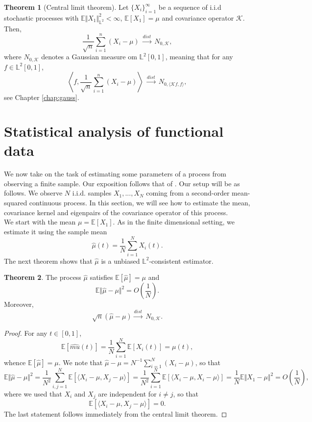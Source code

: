 \documentclass[10pt, a4paper]{report}
\newcommand{\E}[0]{\mathbb{E}}
\newcommand{\Ll}[0]{\mathbb{L}}
\newcommand{\K}[0]{\mathcal{K}}
\theoremstyle{definition}
\newtheorem{theorem}{Theorem}
\theoremstyle{remark}
\begin{document}
\begin{theorem}[Central limit theorem]
	Let $\{X_i\}_{i=1}^\infty$ be a sequence of i.i.d stochastic processes with $\E\Vert X_1 \Vert^2_{\Ll^2}<\infty$, $\E[X_1]=\mu$ and covariance operator $\K$. Then,
	$$\frac{1}{\sqrt{n}}\sum_{i=1}^{n}(X_i-\mu) \ \stackrel{dist}{\longrightarrow} \ N_{0,\K},$$
	where $N_{0,\K}$ denotes a Gaussian measure om $\Ll^2[0,1]$, meaning that for any $f\in \Ll^2[0,1]$,
	$$\left\langle f, \frac{1}{\sqrt{n}}\sum_{i=1}^{n}(X_i-\mu)\right\rangle \ \stackrel{dist}{\longrightarrow} \ N_{0,\langle\K f,f\rangle},$$
	see Chapter \ref{chap:gauss}.
\end{theorem}

\section{Statistical analysis of functional data}
We now take on the task of estimating some parameters of a process from observing a finite sample. Our exposition follows that of \cite{inference}. Our setup will be as follows. We observe $N$ i.i.d. samples $X_1,...,X_N$ coming from a second-order mean-squared continuous process. In this section, we will see how to estimate the mean, covariance kernel and eigenpairs of the covariance operator of this process.\\
We start with the mean $\mu = \E[X_1]$. As in the finite dimensional setting, we estimate it using the sample mean 
$$\hat{\mu}(t) = \frac{1}{N}\sum_{i=1}^{N} X_i(t).$$
The next theorem shows that $\hat{\mu}$ is a unbiased $\Ll^2$-consistent estimator.
\begin{theorem}\label{consmu}
	The process $\hat{\mu}$ satisfies $\E[\hat{\mu}]=\mu$ and 
	$$\E\Vert \hat{\mu}-\mu \Vert^2 = O\left(\frac{1}{N}\right).$$
	Moreover, 
	$$\sqrt{n}(\hat{\mu}-\mu) \stackrel{dist}{\longrightarrow} \ N_{0,\K}.$$ 
	\begin{proof}
		For any $t\in [0,1]$, 
		$$\E[\hat{mu}(t)]=\frac{1}{N}\sum_{i=1}^{N}\E[X_i(t)]=\mu(t),$$
		whence $\E[\hat{\mu}]=\mu$. 
		We note that $\hat{\mu}-\mu = N^{-1}\sum_{i=1}^{N}(X_i-\mu)$, so that 
		$$\E\Vert \hat{\mu}-\mu \Vert^2 = \frac{1}{N^2}\sum_{i,j=1}^{N}\E\left[\langle X_i-\mu,X_j-\mu \rangle \right]=\frac{1}{N^2}\sum_{i=1}^{N}\E\left[\langle X_i-\mu,X_i-\mu \rangle \right] = \frac{1}{N} \E\Vert X_1-\mu \Vert^2 = O\left(\frac{1}{N}\right),$$
		where we used that $X_i$ and $X_j$ are independent for $i\ne j$, so that 
		$$\E\left[\langle X_i-\mu,X_j-\mu \rangle \right] = 0.$$
		The last statement follows immediately from the central limit theorem.
	\end{proof}
\end{theorem}
\end{document}
